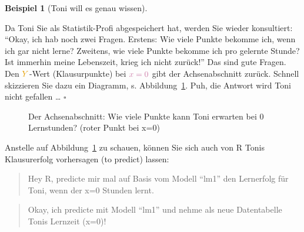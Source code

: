 \documentclass[
  letterpaper,
  twoside,
  open=any]{scrbook}
\theoremstyle{definition}
\theoremstyle{definition}
\newtheorem{example}{Beispiel}[chapter]
\theoremstyle{definition}
\theoremstyle{remark}
\begin{document}
\begin{example}[Toni will es genau
wissen]\protect\hypertarget{exm-noten5}{}\label{exm-noten5}

Da Toni Sie als Statistik-Profi abgespeichert hat, werden Sie wieder
konsultiert: \enquote{Okay, ich hab noch zwei Fragen. Erstens: Wie viele
Punkte bekomme ich, wenn ich gar nicht lerne? Zweitens, wie viele Punkte
bekomme ich pro gelernte Stunde? Ist immerhin meine Lebenszeit, krieg
ich nicht zurück!} {Das sind gute Fragen. Den \(\color{ycol}{Y}\)-Wert
(Klausurpunkte) bei \(\color{xcol}{x}=0\) gibt der Achsenabschnitt
zurück.} Schnell skizzieren Sie dazu ein Diagramm, s.
Abbildung~\ref{fig-beta0}. Puh, die Antwort wird Toni nicht gefallen
\ldots{} \(\square\)

\end{example}

\begin{figure}


\caption{\label{fig-beta0}Der Achsenabschnitt: Wie viele Punkte kann
Toni erwarten bei 0 Lernstunden? (roter Punkt bei x=0)}

\end{figure}%

Anstelle auf Abbildung~\ref{fig-beta0} zu schauen, können Sie sich auch
von R Tonis Klausurerfolg vorhersagen (to predict) lassen:

\begin{quote}
{} Hey R, predicte mir mal auf Basis vom Modell
\enquote{lm1} den Lernerfolg für Toni, wenn der x=0 Stunden lernt.
\end{quote}

\begin{quote}
{} Okay, ich predicte mit Modell \enquote{lm1} und nehme
als neue Datentabelle Tonis Lernzeit (x=0)!
\end{quote}
\end{document}
